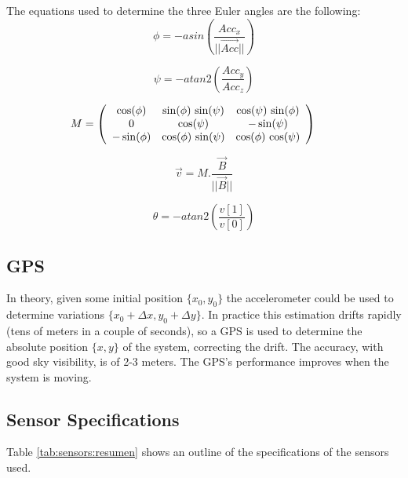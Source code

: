 \documentclass[conference]{IEEEtran}
\begin{document}
The equations used to determine the three Euler angles are the following:
  \[
  \phi = -asin\left(\frac{Acc_x}{\vert\vert\vec{Acc}\vert\vert}\right)
  \]

  \[
  \psi =-atan2\left(\frac{Acc_y}{Acc_z}\right)
  \]
      
  \[
  \hspace{-20pt}
  M = 
\left(\begin{array}{ccc} \cos\!\left(\mathrm{\phi}\right) & \sin\!\left(\mathrm{\phi}\right)\, \sin\!\left(\mathrm{\psi}\right) & \cos\!\left(\mathrm{\psi}\right)\, \sin\!\left(\mathrm{\phi}\right)\\ 0 & \cos\!\left(\mathrm{\psi}\right) & - \sin\!\left(\mathrm{\psi}\right)\\ - \sin\!\left(\mathrm{\phi}\right) & \cos\!\left(\mathrm{\phi}\right)\, \sin\!\left(\mathrm{\psi}\right) & \cos\!\left(\mathrm{\phi}\right)\, \cos\!\left(\mathrm{\psi}\right) \end{array}\right)
  \]

  \[
  \vec{v} = M . \frac{\vec{B}}{\vert \vert \vec{B} \vert \vert}
  \]

  \[
  \theta = -atan2\left( \frac{v[1]}{v[0]}\right)
  \]



\subsection{GPS}
\label{sec:sensors-gps}

In theory, given some initial position $\{x_0 ,y_0\}$ the accelerometer could be used to determine variations $\{x_0+\Delta x,y_0+\Delta y\}$. In practice this estimation drifts rapidly (tens of meters in a couple of seconds), so a GPS is used to determine the absolute position $\{x,y\}$ of the system, correcting the drift. The accuracy, with good sky visibility, is of 2-3 meters. The GPS's performance improves when the system is moving.

\subsection{Sensor Specifications}
\label{sec:sensors-specifications}

Table \ref{tab:sensors:resumen} shows an outline of the specifications of the sensors used.
\end{document}
